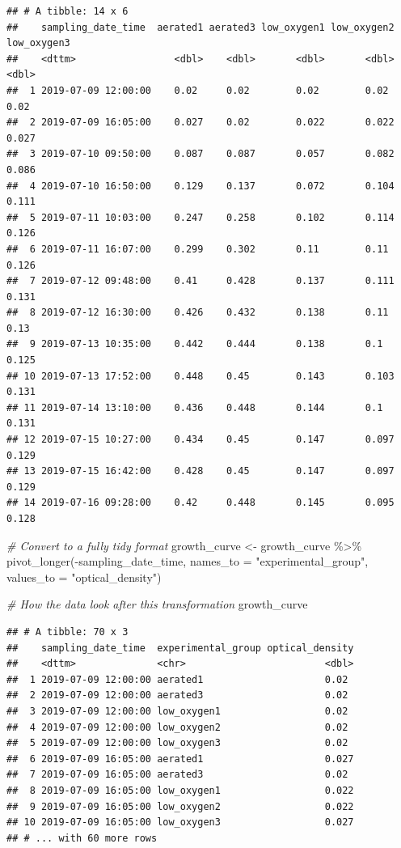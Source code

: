 \documentclass[]{tufte-book}
\newenvironment{Shaded}{}{}
\newcommand{\AttributeTok}[1]{\textcolor[rgb]{0.49,0.56,0.16}{#1}}
\newcommand{\CommentTok}[1]{\textcolor[rgb]{0.38,0.63,0.69}{\textit{#1}}}
\newcommand{\FunctionTok}[1]{\textcolor[rgb]{0.02,0.16,0.49}{#1}}
\newcommand{\NormalTok}[1]{#1}
\newcommand{\OtherTok}[1]{\textcolor[rgb]{0.00,0.44,0.13}{#1}}
\newcommand{\SpecialCharTok}[1]{\textcolor[rgb]{0.25,0.44,0.63}{#1}}
\newcommand{\StringTok}[1]{\textcolor[rgb]{0.25,0.44,0.63}{#1}}
\begin{document}
\begin{verbatim}
## # A tibble: 14 x 6
##    sampling_date_time  aerated1 aerated3 low_oxygen1 low_oxygen2 low_oxygen3
##    <dttm>                 <dbl>    <dbl>       <dbl>       <dbl>       <dbl>
##  1 2019-07-09 12:00:00    0.02     0.02        0.02        0.02        0.02 
##  2 2019-07-09 16:05:00    0.027    0.02        0.022       0.022       0.027
##  3 2019-07-10 09:50:00    0.087    0.087       0.057       0.082       0.086
##  4 2019-07-10 16:50:00    0.129    0.137       0.072       0.104       0.111
##  5 2019-07-11 10:03:00    0.247    0.258       0.102       0.114       0.126
##  6 2019-07-11 16:07:00    0.299    0.302       0.11        0.11        0.126
##  7 2019-07-12 09:48:00    0.41     0.428       0.137       0.111       0.131
##  8 2019-07-12 16:30:00    0.426    0.432       0.138       0.11        0.13 
##  9 2019-07-13 10:35:00    0.442    0.444       0.138       0.1         0.125
## 10 2019-07-13 17:52:00    0.448    0.45        0.143       0.103       0.131
## 11 2019-07-14 13:10:00    0.436    0.448       0.144       0.1         0.131
## 12 2019-07-15 10:27:00    0.434    0.45        0.147       0.097       0.129
## 13 2019-07-15 16:42:00    0.428    0.45        0.147       0.097       0.129
## 14 2019-07-16 09:28:00    0.42     0.448       0.145       0.095       0.128
\end{verbatim}

\begin{Shaded}
\begin{Highlighting}[]
\CommentTok{\# Convert to a fully tidy format}
\NormalTok{growth\_curve }\OtherTok{\textless{}{-}}\NormalTok{ growth\_curve }\SpecialCharTok{\%\textgreater{}\%} 
  \FunctionTok{pivot\_longer}\NormalTok{(}\SpecialCharTok{{-}}\NormalTok{sampling\_date\_time, }
               \AttributeTok{names\_to =} \StringTok{"experimental\_group"}\NormalTok{, }
               \AttributeTok{values\_to =} \StringTok{"optical\_density"}\NormalTok{)}

\CommentTok{\# How the data look after this transformation}
\NormalTok{growth\_curve}
\end{Highlighting}
\end{Shaded}

\begin{verbatim}
## # A tibble: 70 x 3
##    sampling_date_time  experimental_group optical_density
##    <dttm>              <chr>                        <dbl>
##  1 2019-07-09 12:00:00 aerated1                     0.02 
##  2 2019-07-09 12:00:00 aerated3                     0.02 
##  3 2019-07-09 12:00:00 low_oxygen1                  0.02 
##  4 2019-07-09 12:00:00 low_oxygen2                  0.02 
##  5 2019-07-09 12:00:00 low_oxygen3                  0.02 
##  6 2019-07-09 16:05:00 aerated1                     0.027
##  7 2019-07-09 16:05:00 aerated3                     0.02 
##  8 2019-07-09 16:05:00 low_oxygen1                  0.022
##  9 2019-07-09 16:05:00 low_oxygen2                  0.022
## 10 2019-07-09 16:05:00 low_oxygen3                  0.027
## # ... with 60 more rows
\end{verbatim}
\end{document}
